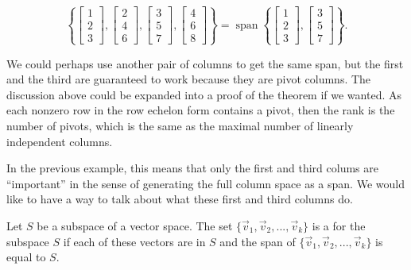 \begin{exampleSol}
\begin{equation*}
\left\{
\begin{bmatrix}
1 \\
2 \\
3 
\end{bmatrix}
,
\begin{bmatrix}
2 \\
4 \\
6
\end{bmatrix}
,
\begin{bmatrix}
3 \\
5 \\
7
\end{bmatrix}
,
\begin{bmatrix}
4 \\
6 \\
8
\end{bmatrix}
\right\}
=
\operatorname{span}
\left\{
\begin{bmatrix}
1 \\
2 \\
3
\end{bmatrix}
,
\begin{bmatrix}
3 \\
5 \\
7
\end{bmatrix}
\right\} .
\end{equation*}
\end{exampleSol}
We could perhaps use another pair of columns to get the same span, but the
first and the third are guaranteed to work because they are pivot columns. The discussion above could be expanded into a proof of the theorem if
we wanted.
As each nonzero row
in the row echelon form contains a pivot, then the rank is the number of
pivots, which is the same as the maximal number of linearly independent
columns. 

In the previous example, this means that only the first and third colums are ``important'' in the sense of generating the full column space as a span. We would like to have a way to talk about what these first and third columns do.

\begin{definition}
Let $S$ be a subspace of a vector space. The set $\{\vec{v}_1, \vec{v}_2, ..., \vec{v}_k\}$ is a \emph{} for the subspace $S$ if each of these vectors are in $S$ and the span of $\{\vec{v}_1, \vec{v}_2, ..., \vec{v}_k\}$ is equal to $S$. 
\end{definition}

